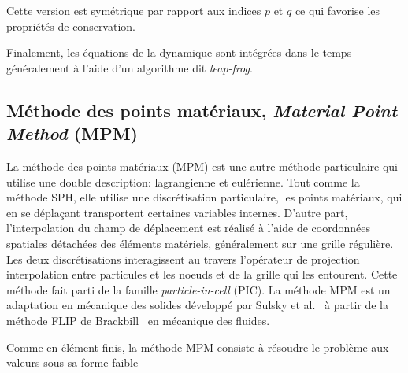 Cette version est symétrique par rapport aux indices $p$ et $q$ ce qui favorise les propriétés de conservation.

Finalement, les équations de la dynamique sont intégrées dans le temps généralement à l'aide d'un algorithme dit \textit{leap-frog}.

\subsection{Méthode des points matériaux, \textit{Material Point Method} (MPM)}

La méthode des points matériaux (MPM) est une autre méthode particulaire qui utilise une double description: lagrangienne et eulérienne. Tout comme la méthode SPH, elle utilise une discrétisation particulaire, les points matériaux, qui en se déplaçant transportent certaines variables internes. D'autre part, l'interpolation du champ de déplacement est réalisé à l'aide de coordonnées spatiales détachées des éléments matériels, généralement sur une grille régulière. Les deux discrétisations interagissent au travers l'opérateur de projection interpolation entre particules et les noeuds et de la grille qui les entourent. Cette méthode fait parti de la famille \textit{particle-in-cell} (PIC). La méthode MPM est un adaptation en mécanique des solides développé par Sulsky et al.~\cite{sulsky_particle_1994} à partir de la méthode FLIP de Brackbill~\cite{brackbill_flip_1988} en mécanique des fluides.

Comme en élément finis, la méthode MPM consiste à résoudre le problème aux valeurs sous sa forme faible

